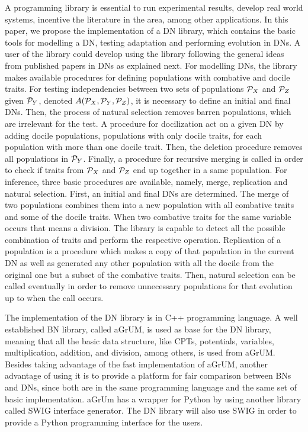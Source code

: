 \documentclass[runningheads,a4paper]{llncs}
\begin{document}
A programming library is essential to run experimental results, develop real world systems, incentive the literature in the area, among other applications.
In this paper, we propose the implementation of a DN library, which contains the basic tools for modelling a DN, testing adaptation and performing evolution in DNs.
A user of the library could develop using the library following the general ideas from published papers in DNs \cite{butzOliveiraSantosCai15} as explained next.
For modelling DNs, the library makes available procedures for defining populations with combative and docile traits.
For testing independencies between two sets of populations ${\cal P}_X$ and ${\cal P}_Z$ given ${\cal P}_Y$, denoted $A({\cal P}_X, {\cal P}_Y, {\cal P}_Z)$, it is necessary to define an initial and final DNs.
Then, the process of natural selection removes barren populations, which are irrelevant for the test.
A procedure for docilization act on a given DN by adding docile populations, populations with only docile traits, for each population with more than one docile trait.
Then, the deletion procedure removes all populations in ${\cal P}_Y$.
Finally, a procedure for recursive merging is called in order to check if traits from ${\cal P}_X$ and ${\cal P}_Z$ end up together in a same population.
For inference, three basic procedures are available, namely, merge, replication and natural selection.
First, an initial and final DNs are determined.
The merge of two populations combines them into a new population with all combative traits and some of the docile traits.
When two combative traits for the same variable occurs that means a division.
The library is capable to detect all the possible combination of traits and perform the respective operation.
Replication of a population is a procedure which makes a copy of that population in the current DN as well as generated any other population with all the docile from the original one but a subset of the combative traits.
Then, natural selection can be called eventually in order to remove unnecessary populations for that evolution up to when the call occurs.

The implementation of the DN library is in C++ programming language.
A well established BN library, called aGrUM, is used as base for the DN library, meaning that all the basic data structure, like CPTs, potentials, variables, multiplication, addition, and  division, among others, is used from aGrUM.
Besides taking advantage of the fast implementation of aGrUM, another advantage of using it is to provide a platform for fair comparison between BNs and DNs, since both are in the same programming language and the same set of basic implementation.
aGrUm has a wrapper for Python by using another library called SWIG interface generator.
The DN library will also use SWIG in order to provide a Python programming interface for the users.
\end{document}
